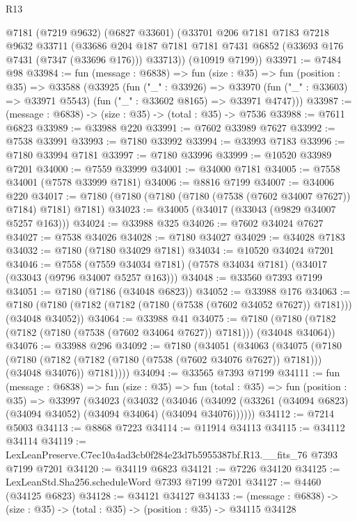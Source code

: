 \begin{lexlean}{R13}
\begin{coremodule}
      @7181
      (@7219 @9632)
      (@6827 @33601)
      (@33701
        @206
        @7181
        @7183
        @7218
        @9632
        @33711
        (@33686 @204 @187 @7181 @7181 @7431 @6852 (@33693 @176 @7431 (@7347 (@33696 @176))) @33713))
      (@10919 @7199))
@33971 := @7484 @98
@33984 := fun (message : @6838) =>
  fun (size : @35) =>
  fun (position : @35) =>
  @33588
    (@33925
      (fun ("_" : @33926) =>
      @33970 (fun ("_" : @33603) => @33971 @5543) (fun ("_" : @33602 @8165) => @33971 @4747)))
@33987 := (message : @6838) -> (size : @35) -> (total : @35) -> @7536
@33988 := @7611 @6823
@33989 := @33988 @220
@33991 := @7602 @33989 @7627
@33992 := @7538 @33991
@33993 := @7180 @33992
@33994 := @33993 @7183
@33996 := @7180 @33994 @7181
@33997 := @7180 @33996
@33999 := @10520 @33989 @7201
@34000 := @7559 @33999
@34001 := @34000 @7181
@34005 := @7558 @34001 (@7578 @33999 @7181)
@34006 := @8816 @7199
@34007 := @34006 @220
@34017 := @7180 (@7180 (@7180 (@7180 (@7538 (@7602 @34007 @7627)) @7184) @7181) @7181)
@34023 := @34005 (@34017 (@33043 (@9829 @34007 @5257 @163)))
@34024 := @33988 @325
@34026 := @7602 @34024 @7627
@34027 := @7538 @34026
@34028 := @7180 @34027
@34029 := @34028 @7183
@34032 := @7180 (@7180 @34029 @7181)
@34034 := @10520 @34024 @7201
@34046 := @7558
    (@7559 @34034 @7181)
    (@7578 @34034 @7181)
    (@34017 (@33043 (@9796 @34007 @5257 @163)))
@34048 := @33560 @7393 @7199
@34051 := @7180 (@7186 (@34048 @6823))
@34052 := @33988 @176
@34063 := @7180 (@7180 (@7182 (@7182 (@7180 (@7538 (@7602 @34052 @7627)) @7181))) (@34048 @34052))
@34064 := @33988 @41
@34075 := @7180 (@7180 (@7182 (@7182 (@7180 (@7538 (@7602 @34064 @7627)) @7181))) (@34048 @34064))
@34076 := @33988 @296
@34092 := @7180
    (@34051
      (@34063
        (@34075
          (@7180
            (@7180 (@7182 (@7182 (@7180 (@7538 (@7602 @34076 @7627)) @7181))) (@34048 @34076))
            @7181))))
@34094 := @33565 @7393 @7199
@34111 := fun (message : @6838) =>
  fun (size : @35) =>
  fun (total : @35) =>
  fun (position : @35) =>
  @33997
    (@34023
      (@34032
        (@34046 (@34092 (@33261 (@34094 @6823) (@34094 @34052) (@34094 @34064) (@34094 @34076))))))
@34112 := @7214 @5003
@34113 := @8868 @7223
@34114 := @11914 @34113
@34115 := @34112 @34114
@34119 := LexLeanPreserve.C7ec10a4ad3cb0f284e23d7b5955387bf.R13.__fits_76 @7393 @7199 @7201
@34120 := @34119 @6823
@34121 := @7226 @34120
@34125 := LexLeanStd.Sha256.scheduleWord @7393 @7199 @7201
@34127 := @4460 (@34125 @6823)
@34128 := @34121 @34127
@34133 := (message : @6838) -> (size : @35) -> (total : @35) -> (position : @35) -> @34115 @34128

\end{coremodule}
\end{lexlean}
